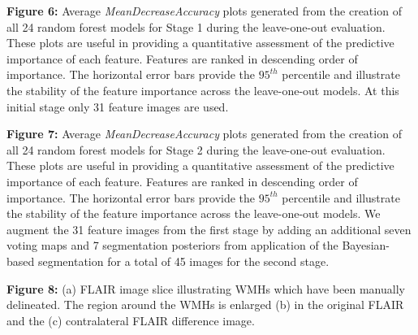 \documentclass[12pt,]{article}
\begin{document}
\textbf{Figure 6:} Average \emph{MeanDecreaseAccuracy} plots generated
from the creation of all 24 random forest models for Stage 1 during the
leave-one-out evaluation. These plots are useful in providing a
quantitative assessment of the predictive importance of each feature.
Features are ranked in descending order of importance. The horizontal
error bars provide the \(95^{th}\) percentile and illustrate the
stability of the feature importance across the leave-one-out models. At
this initial stage only 31 feature images are used.

\textbf{Figure 7:} Average \emph{MeanDecreaseAccuracy} plots generated
from the creation of all 24 random forest models for Stage 2 during the
leave-one-out evaluation. These plots are useful in providing a
quantitative assessment of the predictive importance of each feature.
Features are ranked in descending order of importance. The horizontal
error bars provide the \(95^{th}\) percentile and illustrate the
stability of the feature importance across the leave-one-out models. We
augment the 31 feature images from the first stage by adding an
additional seven voting maps and 7 segmentation posteriors from
application of the Bayesian-based segmentation for a total of 45 images
for the second stage.

\textbf{Figure 8:} (a) FLAIR image slice illustrating WMHs which have
been manually delineated. The region around the WMHs is enlarged (b) in
the original FLAIR and the (c) contralateral FLAIR difference image.

\clearpage

\hypertarget{refs}{}
\end{document}
